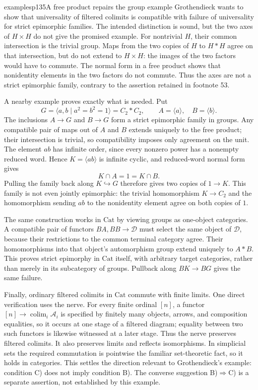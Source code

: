 \begin{dcomment}{examples}{p135}{A free product repairs the group example}
Grothendieck wants to show that universality of filtered colimits is compatible with failure of universality for strict epimorphic families. The intended distinction is sound, but the two axes of $H\times H$ do not give the promised example. For nontrivial $H$, their common intersection is the trivial group. Maps from the two copies of $H$ to $H*H$ agree on that intersection, but do not extend to $H\times H$: the images of the two factors would have to commute. The normal form in a free product shows that nonidentity elements in the two factors do not commute. Thus the axes are not a strict epimorphic family, contrary to the assertion retained in footnote 53.

A nearby example proves exactly what is needed. Put
\[
 G=\langle a,b\mid a^2=b^2=1\rangle=C_2*C_2,
 \qquad A=\langle a\rangle,\quad B=\langle b\rangle.
\]
The inclusions $A\to G$ and $B\to G$ form a strict epimorphic family in groups. Any compatible pair of maps out of $A$ and $B$ extends uniquely to the free product; their intersection is trivial, so compatibility imposes only agreement on the unit. The element $ab$ has infinite order, since every nonzero power has a nonempty reduced word. Hence $K=\langle ab\rangle$ is infinite cyclic, and reduced-word normal form gives
\[
 K\cap A=1=K\cap B.
\]
Pulling the family back along $K\hookrightarrow G$ therefore gives two copies of $1\to K$. This family is not even jointly epimorphic: the trivial homomorphism $K\to C_2$ and the homomorphism sending $ab$ to the nonidentity element agree on both copies of $1$.

The same construction works in $\mathrm{Cat}$ by viewing groups as one-object categories. A compatible pair of functors $BA,B B\to\mathcal D$ must select the same object of $\mathcal D$, because their restrictions to the common terminal category agree. Their homomorphisms into that object's automorphism group extend uniquely to $A*B$. This proves strict epimorphy in $\mathrm{Cat}$ itself, with arbitrary target categories, rather than merely in its subcategory of groups. Pullback along $BK\to BG$ gives the same failure.

Finally, ordinary filtered colimits in $\mathrm{Cat}$ commute with finite limits. One direct verification uses the nerve. For every finite ordinal $[n]$, a functor $[n]\to\operatorname{colim}_i\mathcal A_i$ is specified by finitely many objects, arrows, and composition equalities, so it occurs at one stage of a filtered diagram; equality between two such functors is likewise witnessed at a later stage. Thus the nerve preserves filtered colimits. It also preserves limits and reflects isomorphisms. In simplicial sets the required commutation is pointwise the familiar set-theoretic fact, so it holds in categories. This settles the direction relevant to Grothendieck's example: condition C) does not imply condition B). The converse suggestion B)$\Rightarrow$C) is a separate assertion, not established by this example.
\end{dcomment}


